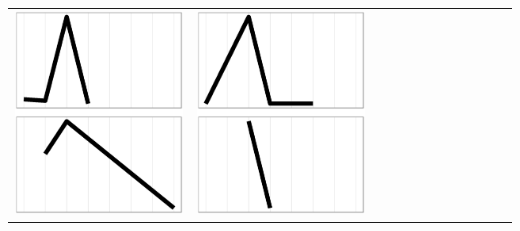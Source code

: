 \documentclass[conference]{IEEEtran}
\begin{document}
\begin{table}
\begin{tabular}{ | b{1.5cm} | c | c | c | c | c | c | c | c | c | c | c |}
 \includegraphics[scale=0.08]{figures/bcaa.ps} &  
 \includegraphics[scale=0.08]{figures/bcbb.ps} &  

\end{tabular}
\end{table}
\end{document}
